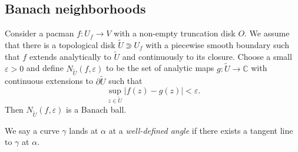\documentclass[]{amsart}
\newcommand{\C}{\mathbb{C}}
\theoremstyle{remark}
\numberwithin{equation}{section}
\theoremstyle{definition}
\begin{document}
\subsection{Banach neighborhoods}
\label{ss:BanNeig and Ren Oper}
Consider a pacman $f:U_f\to V$ with a non-empty truncation disk $O$. We assume that there is a topological disk $\widetilde U\Supset U_f$ with a piecewise smooth boundary such that $f$ extends analytically to $\widetilde U$ and continuously to its closure.
Choose a small $\varepsilon>0$ and define $N_{\widetilde U}(f, \varepsilon)$ to be the set of analytic maps $g:\widetilde U\to \C$ with continuous extensions to $\partial \widetilde U$ such that
\[\sup_{z\in \widetilde U} |f(z)-g(z)| < \varepsilon.\]
Then $N_{\widetilde U}(f,\varepsilon)$ is a Banach ball.

We say a curve $\gamma$ lands at $\alpha$ at a \emph{well-defined angle} if there exists a tangent line to $\gamma$ at $\alpha$.
\end{document}
